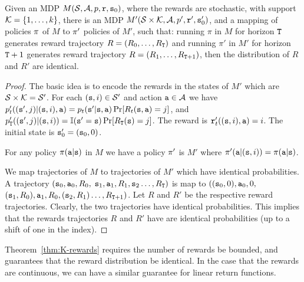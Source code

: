 \begin{theorem}
\label{thm:K-rewards}
%
 Given an MDP $M(\mathcal{S},\mathcal{A},p,{\tt r},{\tt s}_0)$,
where the rewards are stochastic, with support ${\cal
K}=\{1,\ldots,k\}$, there is an MDP $M'(\mathcal{S}\times {\cal
K},\mathcal{A},p',{\tt r}',{\tt s}_0')$, and a mapping of
policies $\pi$ of $M$ to $\pi'$ policies of $M'$, such that:
running $\pi$ in $M$ for horizon ${\tt T}$ generates reward
trajectory $R=(R_0, \ldots , R_{{\tt T}})$ and running $\pi'$ in
$M'$ for horizon ${\tt T}+1$ generates reward trajectory $R=(R_1,
\ldots , R_{{\tt T}+1})$, then the distribution of $R$ and $R'$
are identical.
\end{theorem}

\begin{proof}
The basic idea is to encode the rewards in the states of $M'$ which
are
$\mathcal{S}\times {\cal K}=\mathcal{S}'$.
%
For each $({\tt s},i)\in \mathcal{S}'$ and action ${\tt a}\in\mathcal{A}$ we
have
$p'_t(({\tt s}',j)|({\tt s},i),{\tt a})=p_t({\tt s}'|{\tt s},{\tt a})\Pr[R_t({\tt s},{\tt a})=j]$,
and
$p'_{{\tt T}}(({\tt s}',j)|({\tt s},i))=\mathbb{I}({\tt s}'={\tt s})\Pr[R_{{\tt T}}({\tt s})=j]$.
The reward is ${\tt r}'_t(({\tt s},i),{\tt a})=i$. The initial state
is ${\tt s}'_0=({\tt s}_0,0)$.

For any policy $\pi({\tt a}|{\tt s})$ in $M$ we have a policy
$\pi'$ is $M'$ where
$\pi'({\tt a}|({\tt s},i))=\pi({\tt a}|{\tt s})$.

We map trajectories of $M$ to trajectories of $M'$ which have
identical probabilities. A trajectory $({\tt s}_0, {\tt a}_0 , R_0 ,$
${\tt s}_1,{\tt a}_1,R_1, {\tt s}_2 \ldots, R_{{\tt T}})$ is map to
$(({\tt s}_0,0), {\tt a}_0 , 0 ,$ $ ({\tt s}_1,R_0),{\tt a}_1,R_0,
({\tt s}_2,R_1) \ldots, R_{{\tt T}+1})$. Let $R$ and $R'$ be the
respective reward trajectories.
%
Clearly, the two trajectories have identical probabilities. This
implies that the rewards trajectories $R$ and $R'$ have are
identical probabilities (up to a shift of one in the index).
\end{proof}

Theorem~\ref{thm:K-rewards} requires the number of rewards be
bounded, and guarantees that the reward distribution be identical.
In the case that the rewards are continuous, we can have a similar
guarantee for linear return functions.


